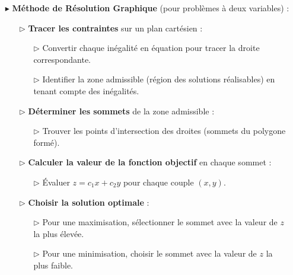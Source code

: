 \documentclass{report}
\begin{document}
\begin{multicols*}{2}
\begin{itemize}
    \item[$\blacktriangleright$] \textbf{Méthode de Résolution Graphique} (pour problèmes à deux variables) :
    \begin{enumerate}
        \item[$\rhd$] \textbf{Tracer les contraintes} sur un plan cartésien :
        \begin{itemize}
            \item[$\rhd$] Convertir chaque inégalité en équation pour tracer la droite correspondante.
            \item[$\rhd$] Identifier la zone admissible (région des solutions réalisables) en tenant compte des inégalités.
        \end{itemize}
        \item[$\rhd$] \textbf{Déterminer les sommets} de la zone admissible :
        \begin{itemize}
            \item[$\rhd$] Trouver les points d'intersection des droites (sommets du polygone formé).
        \end{itemize}
        \item[$\rhd$] \textbf{Calculer la valeur de la fonction objectif} en chaque sommet :
        \begin{itemize}
            \item[$\rhd$] Évaluer $z = c_1x + c_2y$ pour chaque couple $(x, y)$.
        \end{itemize}
        \item[$\rhd$] \textbf{Choisir la solution optimale} :
        \begin{itemize}
            \item[$\rhd$] Pour une maximisation, sélectionner le sommet avec la valeur de $z$ la plus élevée.
            \item[$\rhd$] Pour une minimisation, choisir le sommet avec la valeur de $z$ la plus faible.
        \end{itemize}
    \end{enumerate}
\end{itemize}

\begin{center}
\end{center}
\end{multicols*}
\end{document}
